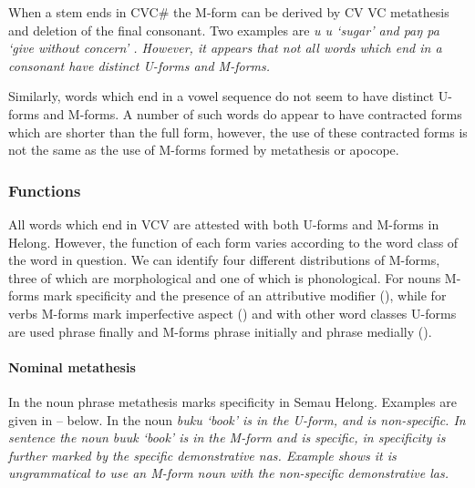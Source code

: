 When a stem ends in CVC{\#} the M-form
can be derived by CV {\ra} VC metathesis and deletion of the final consonant.
Two examples are \it{u} {\ra} \it{u} `sugar'
and \it{paŋ} {\ra} \it{pa} `give without concern' \citep[47]{ba17b}.
However, it appears that not all words which end
in a consonant have distinct U-forms and M-forms.

Similarly, words which end in a vowel sequence
do not seem to have distinct U-forms and M-forms.
A number of such words do appear to have contracted forms which are shorter than the full form,
however, the use of these contracted forms is not the same as the use
of M-forms formed by metathesis or apocope.

\subsubsection{Functions}\label{sec:HelFun}
All words which end in VCV are attested with both U-forms and M-forms in Helong.
However, the function of each form varies according to the word class of the word in question.
We can identify four different distributions of M-forms,
three of which are morphological and one of which is phonological.
For nouns M-forms mark specificity
and the presence of an attributive modifier (),
while for verbs M-forms mark imperfective aspect ()
and with other word classes U-forms are used phrase finally
and M-forms phrase initially and phrase medially ().

\paragraph{Nominal metathesis}\label{sec:MetNP}
In the noun phrase metathesis marks specificity in Semau Helong.
Examples are given in -- below.
In  the noun \it{buku} `book' is in the U-form, and is non-specific.
In sentence  the noun \it{buuk}
`book' is in the M-form and is specific,
in  specificity is further marked by the specific demonstrative \it{nas}.
Example  shows it is ungrammatical to use an M-form noun
with the non-specific demonstrative \it{las}.

\begin{exe}\let\eachwordone=\it
	\label{ex:KatBukuEneng}
	\label{ex:KatTotoangBuuk}
	\label{ex:*KatTotoangBuuk}
\end{exe}

